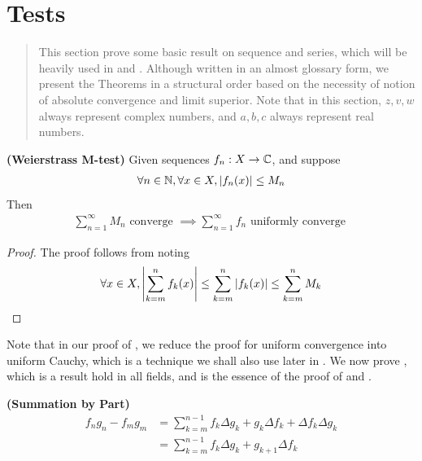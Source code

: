 \documentclass{report}
\begin{document}
\section{Tests}
\label{Basic Technique on Sequence and Series}
\begin{abstract}
This section prove some basic result on sequence and series, which will be heavily used in  and . Although written in an almost glossary form, we present the Theorems in a structural order based on the necessity of notion of absolute convergence and limit superior. Note that in this section, $z,v,w$ always represent complex numbers, and $a,b,c$ always represent real numbers.  
\end{abstract}
\begin{theorem}
\label{WM-t}
\textbf{(Weierstrass M-test)} Given sequences $f_n:X\rightarrow \mathbb{C}$, and suppose 
\begin{align*}
\forall n\in\mathbb{N},\forall x\in X, \left|f_n(x)\right|\leq M_n
\end{align*}
Then 
\begin{align*}
\sum_{n=1}^\infty M_n\text{ converge }\implies \sum_{n=1}^\infty f_n\text{ uniformly converge }
\end{align*} 
\end{theorem}
\begin{proof}
The proof follows from noting 
\begin{align*}
  \forall x\in X, \left|\sum_{k=m}^n f_k(x)\right|\leq \sum_{k=m}^n \left|f_k(x)\right|\leq \sum_{k=m}^n M_k
\end{align*}
\end{proof}
\begin{mdframed}
  Note that in our proof of  , we reduce the proof for uniform convergence into uniform Cauchy, which is a technique we shall also use later in . We now prove , which is a result hold in all fields, and is the essence of the proof of  and . 
\end{mdframed}
\begin{theorem}
\label{Summation by Part}
\textbf{(Summation by Part)} 
\begin{align*}
  f_ng_n-f_mg_m&=\sum_{k=m}^{n-1}f_k \Delta g_k + g_k \Delta f_k+ \Delta f_k \Delta g_k \\
  &=\sum_{k=m}^{n-1}f_k \Delta g_k + g_{k+1}\Delta f_k
\end{align*}
\end{theorem}
\end{document}

